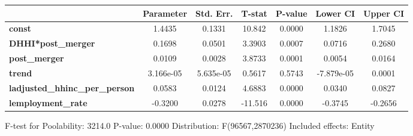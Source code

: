 \documentclass{report}
\begin{document}
\begin{center}
\begin{tabular}{lclc}
\bottomrule
\end{tabular}
\begin{tabular}{lcccccc}
                                       & \textbf{Parameter} & \textbf{Std. Err.} & \textbf{T-stat} & \textbf{P-value} & \textbf{Lower CI} & \textbf{Upper CI}  \\
\midrule
\textbf{const}                         &       1.4435       &       0.1331       &      10.842     &      0.0000      &       1.1826      &       1.7045       \\
\textbf{DHHI*post\_merger}             &       0.1698       &       0.0501       &      3.3903     &      0.0007      &       0.0716      &       0.2680       \\
\textbf{post\_merger}                  &       0.0109       &       0.0028       &      3.8733     &      0.0001      &       0.0054      &       0.0164       \\
\textbf{trend}                         &     3.166e-05      &     5.635e-05      &      0.5617     &      0.5743      &     -7.879e-05    &       0.0001       \\
\textbf{ladjusted\_hhinc\_per\_person} &       0.0583       &       0.0124       &      4.6883     &      0.0000      &       0.0340      &       0.0827       \\
\textbf{lemployment\_rate}             &      -0.3200       &       0.0278       &     -11.516     &      0.0000      &      -0.3745      &      -0.2656       \\
\bottomrule
\end{tabular}
\end{center}

F-test for Poolability: 3214.0 \newline
 P-value: 0.0000 \newline
 Distribution: F(96567,2870236) \newline
  \newline
 Included effects: Entity
\end{document}
